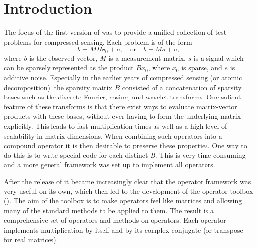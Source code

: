 \chapter{Introduction}

The focus of the first version of \sparco{} was to provide a unified
collection of test problems for compressed sensing. Each problem is of
the form
\[
b = MBx_0 + e,\quad \mbox{or}\quad b = Ms + e,
\]
where $b$ is the observed vector, $M$ is a measurement matrix, $s$ is
a signal which can be sparsely represented as the product $Bx_0$,
where $x_0$ is sparse, and $e$ is additive noise. Especially in the
earlier years of compressed sensing (or atomic decomposition), the
sparsity matrix $B$ consisted of a concatenation of sparsity bases
such as the discrete Fourier, cosine, and wavelet transforms. One
salient feature of these transforms is that there exist ways to
evaluate matrix-vector products with these bases, without ever having
to form the underlying matrix explicitly. This leads to fast
multiplication times as well as a high level of scalability in matrix
dimensions. When combining such operators into a compound operator it
is then desirable to preserve these properties. One way to do this is
to write special code for each distinct $B$. This is very time
consuming and a more general framework was set up to implement all
operators. 

After the release of \sparco{} it became increasingly clear that the
operator framework was very useful on its own, which then led to the
development of the \sparco{} operator toolbox (\spot). The aim of the
toolbox is to make operators feel like matrices and allowing many of
the standard methods to be applied to them. The result is a
comprehensive set of operators and methods on operators. Each operator
implements multiplication by itself and by its complex conjugate (or
transpose for real matrices).





